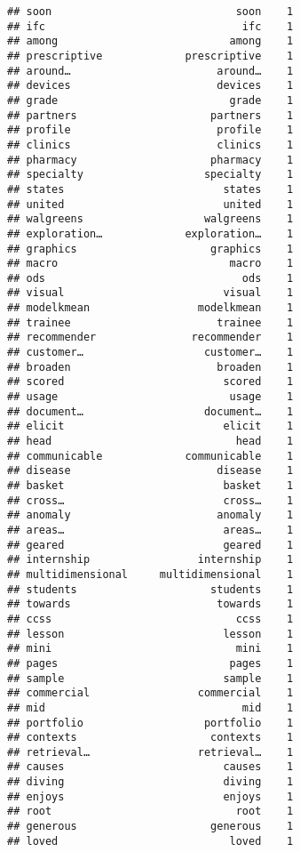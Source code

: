 \documentclass[]{article}
\begin{document}
\begin{verbatim}
## soon                             soon    1
## ifc                               ifc    1
## among                           among    1
## prescriptive             prescriptive    1
## around…                       around…    1
## devices                       devices    1
## grade                           grade    1
## partners                     partners    1
## profile                       profile    1
## clinics                       clinics    1
## pharmacy                     pharmacy    1
## specialty                   specialty    1
## states                         states    1
## united                         united    1
## walgreens                   walgreens    1
## exploration…             exploration…    1
## graphics                     graphics    1
## macro                           macro    1
## ods                               ods    1
## visual                         visual    1
## modelkmean                 modelkmean    1
## trainee                       trainee    1
## recommender               recommender    1
## customer…                   customer…    1
## broaden                       broaden    1
## scored                         scored    1
## usage                           usage    1
## document…                   document…    1
## elicit                         elicit    1
## head                             head    1
## communicable             communicable    1
## disease                       disease    1
## basket                         basket    1
## cross…                         cross…    1
## anomaly                       anomaly    1
## areas…                         areas…    1
## geared                         geared    1
## internship                 internship    1
## multidimensional     multidimensional    1
## students                     students    1
## towards                       towards    1
## ccss                             ccss    1
## lesson                         lesson    1
## mini                             mini    1
## pages                           pages    1
## sample                         sample    1
## commercial                 commercial    1
## mid                               mid    1
## portfolio                   portfolio    1
## contexts                     contexts    1
## retrieval…                 retrieval…    1
## causes                         causes    1
## diving                         diving    1
## enjoys                         enjoys    1
## root                             root    1
## generous                     generous    1
## loved                           loved    1

\end{verbatim}
\end{document}
